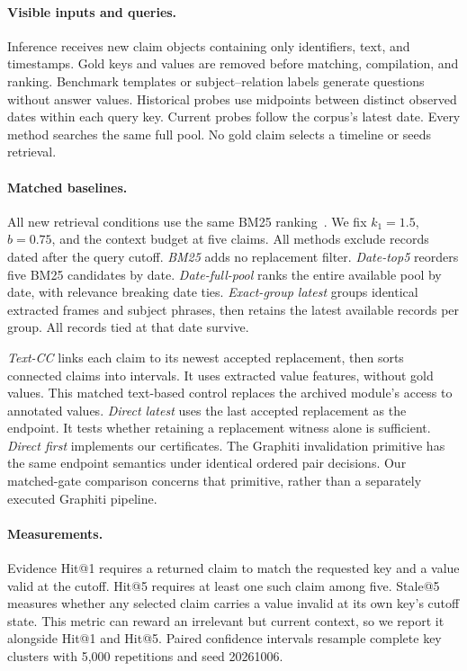 \paragraph{Visible inputs and queries.}
Inference receives new claim objects containing only identifiers, text, and timestamps.
Gold keys and values are removed before matching, compilation, and ranking.
Benchmark templates or subject--relation labels generate questions without answer values.
Historical probes use midpoints between distinct observed dates within each query key.
Current probes follow the corpus's latest date.
Every method searches the same full pool.
No gold claim selects a timeline or seeds retrieval.

\paragraph{Matched baselines.}
All new retrieval conditions use the same BM25 ranking~\citep{robertson1995bm25}.
We fix $k_1=1.5$, $b=0.75$, and the context budget at five claims.
All methods exclude records dated after the query cutoff.
\emph{BM25} adds no replacement filter.
\emph{Date-top5} reorders five BM25 candidates by date.
\emph{Date-full-pool} ranks the entire available pool by date, with relevance breaking date ties.
\emph{Exact-group latest} groups identical extracted frames and subject phrases, then retains the latest available records per group.
All records tied at that date survive.

\emph{Text-CC} links each claim to its newest accepted replacement, then sorts connected claims into intervals.
It uses extracted value features, without gold values.
This matched text-based control replaces the archived module's access to annotated values.
\emph{Direct latest} uses the last accepted replacement as the endpoint.
It tests whether retaining a replacement witness alone is sufficient.
\emph{Direct first} implements our certificates.
The Graphiti invalidation primitive has the same endpoint semantics under identical ordered pair decisions.
Our matched-gate comparison concerns that primitive, rather than a separately executed Graphiti pipeline.

\paragraph{Measurements.}
Evidence Hit@1 requires a returned claim to match the requested key and a value valid at the cutoff.
Hit@5 requires at least one such claim among five.
Stale@5 measures whether any selected claim carries a value invalid at its own key's cutoff state.
This metric can reward an irrelevant but current context, so we report it alongside Hit@1 and Hit@5.
Paired confidence intervals resample complete key clusters with 5,000 repetitions and seed 20261006.

